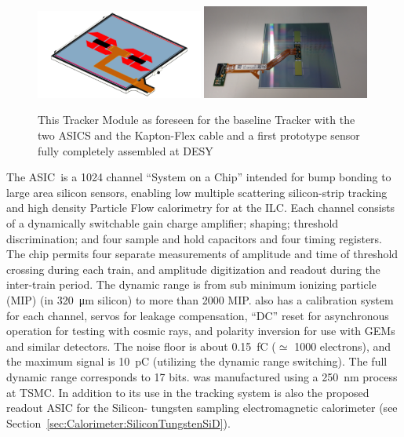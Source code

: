 \begin{figure}
\includegraphics[width=0.49\textwidth]{Tracker/KPIX/Tracker_Module_SiD_Drawing.png}
\includegraphics[width=0.49\textwidth]{Tracker/KPIX/Tracker_Module_SiD_Photo.jpg}
\caption{This \SID Tracker Module as foreseen for the baseline \SID Tracker\cite{Behnke:2013lya} with the two \KPIX ASICS and the Kapton-Flex cable 
and a first prototype sensor fully completely assembled at DESY}
\label{fig:SiliconTrackin:KPiX:module}
\end{figure}

The \KPIX ASIC~\cite{6551433}is a 1024 channel ``System on a Chip'' intended for bump bonding 
to large area silicon sensors, enabling low multiple scattering silicon-strip 
tracking and high density Particle Flow calorimetry for \SID at the ILC. 
Each channel consists of a dynamically switchable gain charge amplifier; 
shaping; threshold discrimination; and four sample and hold 
capacitors and four timing registers. The chip permits four  separate measurements of 
amplitude and time of threshold crossing during each train, and amplitude 
digitization and readout during the inter-train period. The dynamic range is from 
sub minimum ionizing particle (MIP) (in \SI{320}{\micro\meter} silicon) to more 
than 2000 MIP. \KPIX also has a calibration system for each channel, servos for 
leakage compensation, ``DC'' reset for asynchronous operation for testing with 
cosmic rays, and polarity inversion for use with GEMs and similar detectors. The 
noise floor is about \SI{0.15}{fC} ($\simeq$ 1000 electrons), and the maximum 
signal is \SI{10}{pC} (utilizing the dynamic range switching). The full dynamic 
range corresponds to 17 bits. \KPIX was manufactured using a \SI{250}{\nano\meter} process at TSMC.
In addition to its use in the \SID tracking system  \KPIX is also the proposed readout ASIC  for the \SID Silicon-
tungsten sampling electromagnetic calorimeter (see Section~\ref{sec:Calorimeter:SiliconTungstenSiD}).




